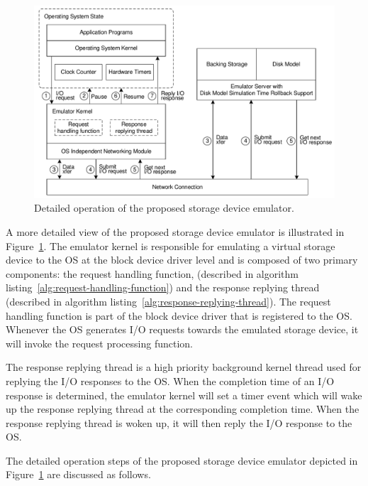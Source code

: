 \begin{figure}[htpb]
	\centering
	\includegraphics[width=\textwidth]{figures/ch6-fig-8.pdf}
	\caption{\label{fig:ch6-fig-8}Detailed operation of the proposed storage device emulator.}
\end{figure}

A more detailed view of the proposed storage device emulator is illustrated in Figure~\ref{fig:ch6-fig-8}. The emulator kernel is responsible for emulating a virtual storage device to the OS at the block device driver level and is composed of two primary components: the request handling function, (described in algorithm listing~\ref{alg:request-handling-function}) and the response replying thread (described in algorithm listing~\ref{alg:response-replying-thread}). The request handling function is part of the block device driver that is registered to the OS. Whenever the OS generates I/O requests towards the emulated storage device, it will invoke the request processing function.

The response replying thread is a high priority background kernel thread used for replying the I/O responses to the OS. When the completion time of an I/O response is determined, the emulator kernel will set a timer event which will wake up the response replying thread at the corresponding completion time. When the response replying thread is woken up, it will then reply the I/O response to the OS.

The detailed operation steps of the proposed storage device emulator depicted in Figure~\ref{fig:ch6-fig-8} are discussed as follows.

